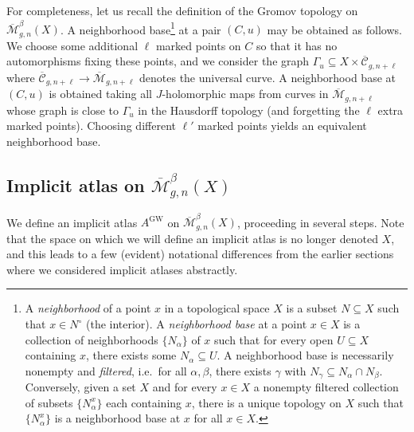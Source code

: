 \documentclass[12pt]{article}
\theoremstyle{definition}
\theoremstyle{remark}
\numberwithin{equation}{subsection}
\newcommand{\Mbar}{\overline{\mathcal M}}
\newcommand{\Cbar}{\overline{\mathcal C}}
\newcommand{\GW}{\mathrm{GW}}
\begin{document}
For completeness, let us recall the definition of the Gromov topology on $\Mbar_{g,n}^\beta(X)$.  A neighborhood base\footnote{A \emph{neighborhood} of a point $x$ in a topological space $X$ is a subset $N\subseteq X$ such that $x\in N^\circ$ (the interior).  A \emph{neighborhood base} at a point $x\in X$ is a collection of neighborhoods $\{N_\alpha\}$ of $x$ such that for every open $U\subseteq X$ containing $x$, there exists some $N_\alpha\subseteq U$.  A neighborhood base is necessarily nonempty and \emph{filtered}, i.e.\ for all $\alpha,\beta$, there exists $\gamma$ with $N_\gamma\subseteq N_\alpha\cap N_\beta$.  Conversely, given a set $X$ and for every $x\in X$ a nonempty filtered collection of subsets $\{N_\alpha^x\}$ each containing $x$, there is a unique topology on $X$ such that $\{N^x_\alpha\}$ is a neighborhood base at $x$ for all $x\in X$.} at a pair $(C,u)$ may be obtained as follows.  We choose some additional $\ell$ marked points on $C$ so that it has no automorphisms fixing these points, and we consider the graph $\Gamma_u\subseteq X\times\Cbar_{g,n+\ell}$ where $\Cbar_{g,n+\ell}\to\Mbar_{g,n+\ell}$ denotes the universal curve.  A neighborhood base at $(C,u)$ is obtained taking all $J$-holomorphic maps from curves in $\Mbar_{g,n+\ell}$ whose graph is close to $\Gamma_u$ in the Hausdorff topology (and forgetting the $\ell$ extra marked points).  Choosing different $\ell'$ marked points yields an equivalent neighborhood base.

\subsection{Implicit atlas on \texorpdfstring{$\Mbar_{g,n}^\beta(X)$}{Mbar\_g,n\textasciicircum beta(X)}}\label{gromovwittenimplicitatlassubsection}

We define an implicit atlas $A^\GW$ on $\Mbar_{g,n}^\beta(X)$, proceeding in several steps.  Note that the space on which we will define an implicit atlas is no longer denoted $X$, and this leads to a few (evident) notational differences from the earlier sections where we considered implicit atlases abstractly.
\end{document}
